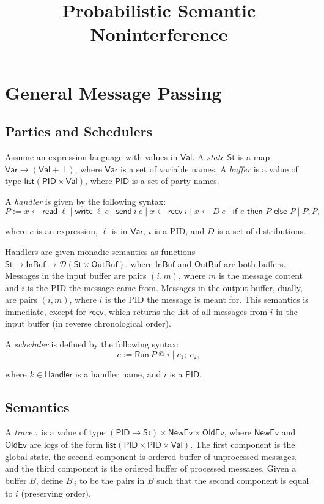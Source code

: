 \documentclass{article}
\title {Probabilistic Semantic Noninterference}
\newcommand{\Val}{\mathsf{Val}}
\newcommand{\St}{\mathsf{St}}
\newcommand{\InBuf}{\mathsf{InBuf}}
\newcommand{\OutBuf}{\mathsf{OutBuf}}
\newcommand{\PID}{\mathsf{PID}}
\newcommand{\Var}{\mathsf{Var}}
\newcommand{\Handler}{\mathsf{Handler}}
\renewcommand{\list}{\mathsf{list}}
\newcommand{\D}{\mathcal{D}}
\newcommand{\NewEv}{\mathsf{NewEv}}
\newcommand{\OldEv}{\mathsf{OldEv}}
\newcommand{\Read}{\mathsf{read}}
\newcommand{\Write}{\mathsf{write}}
\newcommand{\send}{\mathsf{send}}
\newcommand{\recv}{\mathsf{recv}}
\begin{document}
\maketitle


\section{General Message Passing}
\subsection{Parties and Schedulers}

Assume an expression language with values in $\Val$. A \emph{state} $\St$ is a map $\Var \to (\Val + \bot)$, where $\Var$ is a set of variable names. A \emph{buffer} is a value of type $\list (\PID \times \Val)$, where $\PID$ is a set of party names.

A \emph{handler} is given by the following syntax:
\[ P := x \leftarrow \Read\ \ell \mid \Write\ \ell\ e \mid \send\ i\ e \mid x \leftarrow \recv\ i \mid x \leftarrow D\ e \mid \textsf{if } e \textsf{ then } P \textsf{ else } P \mid P; P, \]

where $e$ is an expression, $\ell$ is in $\Var$, $i$ is a PID, and $D$ is a set of distributions.

Handlers are given monadic semantics as functions $\St \to \InBuf \to \D(\St \times \OutBuf)$, where $\InBuf$ and $\OutBuf$ are both buffers. Messages in the input buffer are pairs $(i,m)$, where $m$ is the message content and $i$ is the PID the message came from. Messages in the output buffer, dually, are pairs $(i,m)$, where $i$ is the PID the message is meant for. This semantics is immediate, except for $\recv$, which returns the list of all messages from $i$ in the input buffer (in reverse chronological order).

A \emph{scheduler} is defined by the following syntax:
\[ c := \textsf{Run}\ P\ @\ i \mid c_1;\ c_2, \]

where $k \in \Handler$ is a handler name, and $i$ is a $\PID$.

\subsection{Semantics}

A \emph{trace} $\tau$ is a value of type $(\PID \to \St) \times \NewEv \times \OldEv$, where $\NewEv$ and $\OldEv$ are logs of the form $\list (\PID \times \PID \times \Val)$. The first component is the global state, the second component is ordered buffer of unprocessed messages, and the third component is the ordered buffer of processed messages. Given a buffer $B$, define $B_{| i}$ to be the pairs in $B$ such that the second component is equal to $i$ (preserving order).
\end{document}
